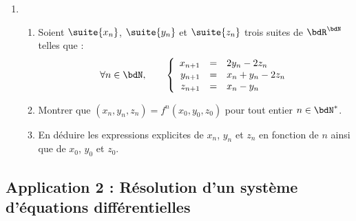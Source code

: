 \documentclass[a4paper,french,bookmarks]{article}
\begin{document}
\begin{enumerate}[resume]
    \item \begin{enumerate}
        \item[] Soient $\suite{x_n}$, $\suite{y_n}$ et $\suite{z_n}$
        trois suites de $\bdR^\bdN$ telles que :
        \begin{equation}
            \forall n \in \bdN,\qquad \left\lbrace\begin{array}{rcl}
                x_{n+1} &=& 2y_n - 2z_n  \\
                y_{n+1} &=& x_n + y_n - 2z_n \\
                z_{n+1} &=& x_n - y_n
        \end{array}\right.
        \end{equation}
        \item Montrer que $\left(x_n, y_n, z_n\right) = f^n\left(x_0,
        y_0, z_0\right)$ pour tout entier $n \in \bdN^*$.
        
    
        \item En déduire les expressions explicites de $x_n$, $y_n$ et
        $z_n$ en fonction de $n$ ainsi que de $x_0$, $y_0$ et $z_0$.
        
    \end{enumerate}
    
\end{enumerate}

\subsection*{Application 2 : Résolution d'un système d'équations
différentielles}
\end{document}
